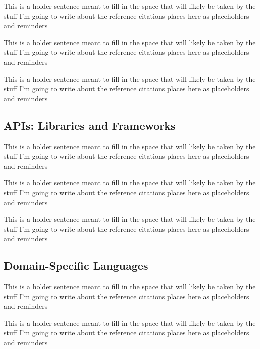 \cite{shiva2007a-software}

This is a holder sentence meant to fill in the space that will likely be taken by the stuff I'm going to write about the reference citations places here as placeholders and reminders

\cite{mohagheghi2008a-an-empirical}

This is a holder sentence meant to fill in the space that will likely be taken by the stuff I'm going to write about the reference citations places here as placeholders and reminders

\cite{lorenz2011a-code}

This is a holder sentence meant to fill in the space that will likely be taken by the stuff I'm going to write about the reference citations places here as placeholders and reminders

\subsection{APIs: Libraries and Frameworks}

This is a holder sentence meant to fill in the space that will likely be taken by the stuff I'm going to write about the reference citations places here as placeholders and reminders


This is a holder sentence meant to fill in the space that will likely be taken by the stuff I'm going to write about the reference citations places here as placeholders and reminders

\cite{polancic2010a-an-empirical}

This is a holder sentence meant to fill in the space that will likely be taken by the stuff I'm going to write about the reference citations places here as placeholders and reminders

\subsection{Domain-Specific Languages}

This is a holder sentence meant to fill in the space that will likely be taken by the stuff I'm going to write about the reference citations places here as placeholders and reminders

\cite{hudak1996building}

This is a holder sentence meant to fill in the space that will likely be taken by the stuff I'm going to write about the reference citations places here as placeholders and reminders

